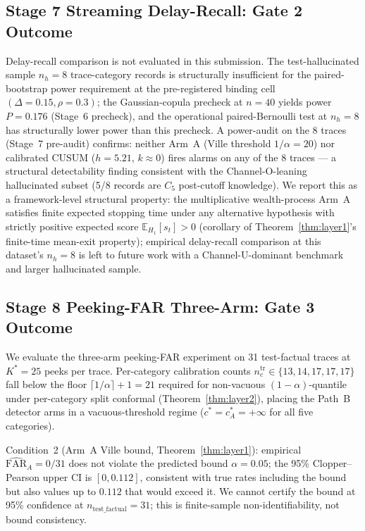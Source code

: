 \documentclass[runningheads]{llncs}
\begin{document}
\subsection{Stage 7 Streaming Delay-Recall: Gate 2 Outcome}
\label{ssec:results-streaming}

Delay-recall comparison is not evaluated in this submission. The
test-hallucinated sample $n_h = 8$ trace-category records is structurally
insufficient for the paired-bootstrap power requirement at the
pre-registered binding cell $(\Delta=0.15, \rho=0.3)$; the Gaussian-copula
precheck at $n=40$ yields power $P = 0.176$ (Stage~6 precheck), and the
operational paired-Bernoulli test at $n_h = 8$ has structurally lower power
than this precheck.
A power-audit on the 8 traces (Stage~7 pre-audit) confirms: neither
Arm~A (Ville threshold $1/\alpha = 20$) nor calibrated CUSUM
($h = 5.21$, $k \approx 0$) fires alarms on any of the 8 traces — a
structural detectability finding consistent with the Channel-O-leaning
hallucinated subset (5/8 records are $C_5$ post-cutoff knowledge).
We report this as a framework-level structural property: the multiplicative
wealth-process Arm~A satisfies finite expected stopping time under any
alternative hypothesis with strictly positive expected score
$\mathbb{E}_{H_1}[s_t] > 0$ (corollary of Theorem~\ref{thm:layer1}'s
finite-time mean-exit property); empirical delay-recall comparison at this
dataset's $n_h = 8$ is left to future work with a Channel-U-dominant
benchmark and larger hallucinated sample.

\subsection{Stage 8 Peeking-FAR Three-Arm: Gate 3 Outcome}
\label{ssec:results-peeking}

We evaluate the three-arm peeking-FAR experiment on 31 test-factual traces
at $K^* = 25$ peeks per trace. Per-category calibration counts
$n_c^{\text{tr}} \in \{13, 14, 17, 17, 17\}$ fall below the floor
$\lceil 1/\alpha \rceil + 1 = 21$ required for non-vacuous
$(1-\alpha)$-quantile under per-category split conformal
(Theorem~\ref{thm:layer2}), placing the Path~B detector arms in a
vacuous-threshold regime ($c^* = c_A^* = +\infty$ for all five categories).

Condition~2 (Arm~A Ville bound, Theorem~\ref{thm:layer1}): empirical
$\hat{\text{FAR}}_A = 0/31$ does not violate the predicted bound
$\alpha = 0.05$; the 95\% Clopper--Pearson upper CI is $[0, 0.112]$,
consistent with true rates including the bound but also values up to
$0.112$ that would exceed it. We cannot certify the bound at 95\%
confidence at $n_{\text{test\_factual}} = 31$; this is finite-sample
non-identifiability, not bound consistency.
\end{document}

